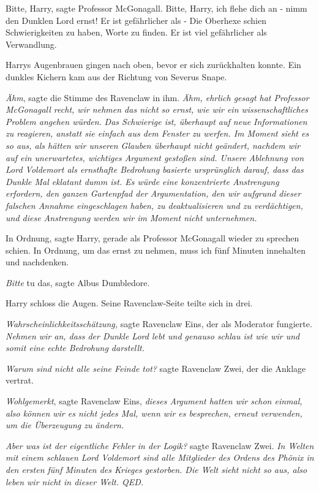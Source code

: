 \glqq Bitte, Harry\grqq{}, sagte Professor McGonagall. \glqq Bitte, Harry, ich
flehe dich an - nimm den Dunklen Lord ernst! Er ist gefährlicher als -\grqq{}
Die Oberhexe schien Schwierigkeiten zu haben, Worte zu finden. \glqq Er ist viel
gefährlicher als Verwandlung.\grqq{}

Harrys Augenbrauen gingen nach oben, bevor er sich zurückhalten konnte. Ein
dunkles Kichern kam aus der Richtung von Severus Snape.

\emph{Ähm}, sagte die Stimme des Ravenclaw in ihm. \emph{Ähm, ehrlich gesagt hat
Professor McGonagall recht, wir nehmen das nicht so ernst, wie wir ein
wissenschaftliches Problem angehen würden. }
\emph{Das Schwierige ist, überhaupt auf neue Informationen zu reagieren, anstatt sie einfach aus dem Fenster zu werfen. Im Moment sieht es so aus, als hätten wir unseren Glauben überhaupt nicht geändert, nachdem wir auf ein unerwartetes, wichtiges Argument gestoßen sind. Unsere Ablehnung von Lord Voldemort als ernsthafte Bedrohung basierte ursprünglich darauf, dass das Dunkle Mal eklatant dumm ist. Es würde eine konzentrierte Anstrengung erfordern, den ganzen Gartenpfad der Argumentation, den wir aufgrund dieser falschen Annahme eingeschlagen haben, zu deaktualisieren und zu verdächtigen, und diese Anstrengung werden wir im Moment nicht unternehmen.}

\glqq In Ordnung\grqq{}, sagte Harry, gerade als Professor McGonagall wieder zu
sprechen schien. \glqq In Ordnung, um das ernst zu nehmen, muss ich fünf Minuten
innehalten und nachdenken.\grqq{}

\glqq \emph{Bitte} tu das\grqq{}, sagte Albus Dumbledore.

Harry schloss die Augen. Seine Ravenclaw-Seite teilte sich in drei.

\emph{Wahrscheinlichkeitsschätzung,} sagte Ravenclaw Eins, der als Moderator
fungierte. \emph{Nehmen wir an, dass der Dunkle Lord lebt und genauso schlau ist
wie wir und somit eine echte Bedrohung darstellt. }

\emph{Warum sind nicht alle seine Feinde tot? }sagte Ravenclaw Zwei, der die
Anklage vertrat.

\emph{Wohlgemerkt}, sagte Ravenclaw Eins, \emph{dieses Argument hatten wir schon
einmal, also können wir es nicht jedes Mal, wenn wir es besprechen, erneut
verwenden, um die Überzeugung zu ändern. }

\emph{Aber was ist der eigentliche Fehler in der Logik?} sagte Ravenclaw Zwei.
\emph{In Welten mit einem schlauen Lord Voldemort sind alle Mitglieder des
Ordens des Phönix in den ersten fünf Minuten des Krieges gestorben. Die Welt
sieht nicht so aus, also leben wir nicht in dieser Welt. QED. }

